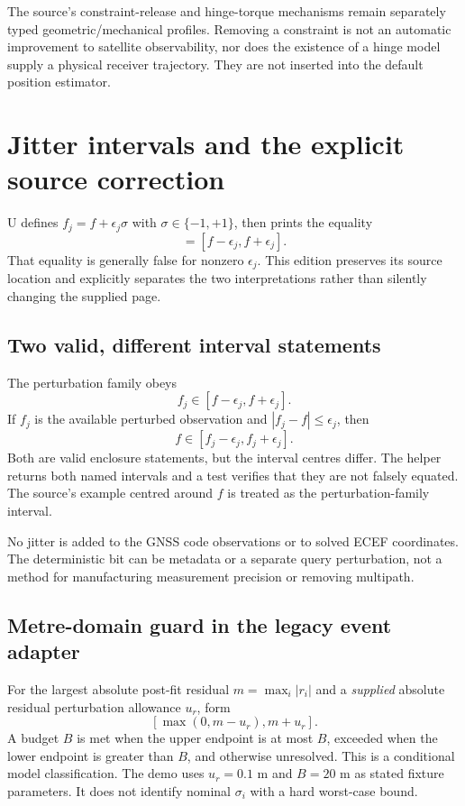 The source's constraint-release and hinge-torque mechanisms remain separately typed
geometric/mechanical profiles. Removing a constraint is not an automatic improvement
to satellite observability, nor does the existence of a hinge model supply a physical
receiver trajectory. They are not inserted into the default position estimator.
\clearpage

\section{Jitter intervals and the explicit source correction}
U defines $f_j=f+\epsilon_j\sigma$ with $\sigma\in\{-1,+1\}$, then prints the equality
\begin{equation}
[f_j-\epsilon_j,f_j+\epsilon_j]=[f-\epsilon_j,f+\epsilon_j].
\end{equation}
That equality is generally false for nonzero $\epsilon_j$. This edition preserves
its source location and explicitly separates the two interpretations rather than
silently changing the supplied page. 

\subsection{Two valid, different interval statements}
The perturbation family obeys
\begin{equation}
f_j\in[f-\epsilon_j,f+\epsilon_j].
\end{equation}
If $f_j$ is the available perturbed observation and $|f_j-f|\le\epsilon_j$, then
\begin{equation}
f\in[f_j-\epsilon_j,f_j+\epsilon_j].
\end{equation}
Both are valid enclosure statements, but the interval centres differ. The helper
returns both named intervals and a test verifies that they are not falsely equated.
The source's example centred around $f$ is treated as the perturbation-family interval.

No jitter is added to the GNSS code observations or to solved ECEF coordinates.
The deterministic bit can be metadata or a separate query perturbation, not a method
for manufacturing measurement precision or removing multipath.

\subsection{Metre-domain guard in the legacy event adapter}
For the largest absolute post-fit residual $m=\max_i|r_i|$ and a \emph{supplied}
absolute residual perturbation allowance $u_r$, form
\begin{equation}
\left[\max(0,m-u_r),m+u_r\right].
\end{equation}
A budget $B$ is met when the upper endpoint is at most $B$, exceeded when the lower
endpoint is greater than $B$, and otherwise unresolved. This is a conditional model
classification. The demo uses $u_r=0.1$ m and $B=20$ m as stated fixture parameters.
It does not identify nominal $\sigma_i$ with a hard worst-case bound.
\clearpage

